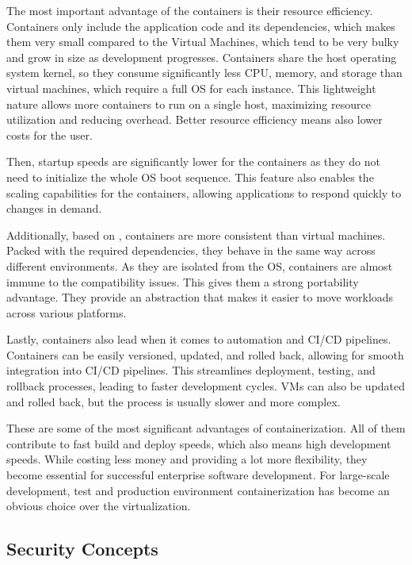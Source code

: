 The most important advantage of the containers is their resource efficiency. Containers only include the application code and its dependencies, which makes them very small compared to the Virtual Machines, which tend to be very bulky and grow in size as development progresses. Containers share the host operating system kernel, so they consume significantly less CPU, memory, and storage than virtual machines, which require a full OS for each instance. This lightweight nature allows more containers to run on a single host, maximizing resource utilization and reducing overhead. Better resource efficiency means also lower costs for the user.

Then, startup speeds are significantly lower for the containers as they do not need to initialize the whole OS boot sequence. This feature also enables the scaling capabilities for the containers, allowing applications to respond quickly to changes in demand.

Additionally, based on \cite{kubernetes-in-action}, containers are more consistent than virtual machines. Packed with the required dependencies, they behave in the same way across different environments. As they are isolated from the OS, containers are almost immune to the compatibility issues. This gives them a strong portability advantage. They provide an abstraction that makes it easier to move workloads across various platforms.

Lastly, containers also lead when it comes to automation and CI/CD pipelines. Containers can be easily versioned, updated, and rolled back, allowing for smooth integration into CI/CD pipelines. This streamlines deployment, testing, and rollback processes, leading to faster development cycles. VMs can also be updated and rolled back, but the process is usually slower and more complex.

These are some of the most significant advantages of containerization. All of them contribute to fast build and deploy speeds, which also means high development speeds. While costing less money and providing a lot more flexibility, they become essential for successful enterprise software development. For large-scale development, test and production environment containerization has become an obvious choice over the virtualization.

\subsection{Security Concepts}

